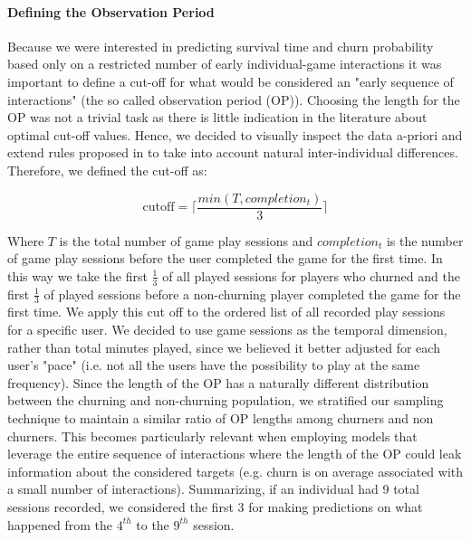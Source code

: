 

\paragraph*{Defining the Observation Period}
Because we were interested in predicting survival time and churn probability based only on a restricted number of early individual-game interactions it was important to define a cut-off for what would be considered an "early sequence of interactions" (the so called observation period (OP)). Choosing the length for the OP was not a trivial task as there is little indication in the literature about optimal cut-off values. Hence, we decided to visually inspect the data a-priori and extend rules proposed in \cite{drachen2016rapid, milovsevic2017early} to take into account natural inter-individual differences. Therefore, we defined the cut-off as:

\begin{equation}
\label{cutoffop}
    \text{cutoff} = 
    \Biggl\lceil
        \dfrac
            {min(T, completion_t)}
            {3}
    \Biggr\rceil
\end{equation}

Where $T$ is the total number of game play sessions and $completion_t$ is the number of game play sessions before the user completed the game for the first time. In this way we take the first $\frac{1}{3}$ of all played sessions for players who churned and the first $\frac{1}{3}$ of played sessions before a non-churning player completed the game for the first time. We apply this cut off to the ordered list of all recorded play sessions for a specific user. We decided to use game sessions as the temporal dimension, rather than total minutes played, since we believed it better adjusted for each user's "pace" (i.e. not all the users have the possibility to play at the same frequency). Since the length of the OP has a naturally different distribution between the churning and non-churning population, we stratified our sampling technique to maintain a similar ratio of OP lengths among churners and non churners. This becomes particularly relevant when employing models that leverage the entire sequence of interactions where the length of the OP could leak information about the considered targets (e.g. churn is on average associated with a small number of interactions). Summarizing, if an individual had 9 total sessions recorded, we considered the first 3 for making predictions on what happened from the $4^{th}$ to the $9^{th}$ session. 

